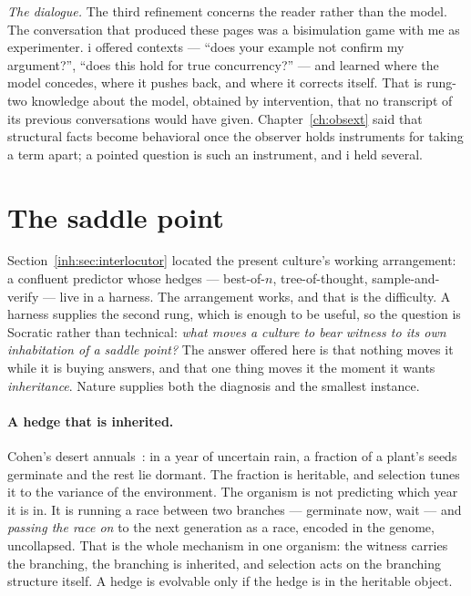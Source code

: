 \emph{The dialogue.}
The third refinement concerns the reader rather than the model.
The conversation that produced these pages was a bisimulation game with
me as experimenter.
i offered contexts --- ``does your example not confirm my argument?'',
``does this hold for true concurrency?'' --- and learned where the model
concedes, where it pushes back, and where it corrects itself.
That is rung-two knowledge about the model, obtained by intervention,
that no transcript of its previous conversations would have given.
Chapter~\ref{ch:obsext} said that structural facts become behavioral
once the observer holds instruments for taking a term apart; a pointed
question is such an instrument, and i held several.

\section{The saddle point}
\label{inh:sec:saddle}

Section~\ref{inh:sec:interlocutor} located the present culture's
working arrangement: a confluent predictor whose hedges --- best-of-$n$,
tree-of-thought, sample-and-verify --- live in a harness.
The arrangement works, and that is the difficulty.
A harness supplies the second rung, which is enough to be useful, so the
question is Socratic rather than technical: \emph{what moves a culture
to bear witness to its own inhabitation of a saddle point?}
The answer offered here is that nothing moves it while it is buying
answers, and that one thing moves it the moment it wants
\emph{inheritance}.
Nature supplies both the diagnosis and the smallest instance.

\paragraph{A hedge that is inherited.}
Cohen's desert annuals~\cite{Cohen66}: in a year of uncertain rain, a
fraction of a plant's seeds germinate and the rest lie dormant.
The fraction is heritable, and selection tunes it to the variance of the
environment.
The organism is not predicting which year it is in.
It is running a race between two branches --- germinate now, wait ---
and \emph{passing the race on} to the next generation as a race,
encoded in the genome, uncollapsed.
That is the whole mechanism in one organism: the witness carries the
branching, the branching is inherited, and selection acts on the
branching structure itself.
A hedge is evolvable only if the hedge is in the heritable object.

